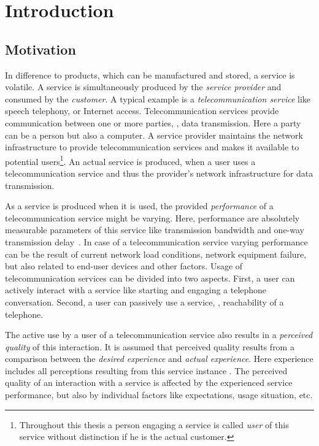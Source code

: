 \chapter{Introduction}\label{chap:01}

\section{Motivation}
In difference to products, which can be manufactured and stored, a service is volatile.
A service is simultaneously produced by the \emph{service provider} and consumed by the \emph{customer}.
A typical example is a \emph{telecommunication service} like speech telephony, or Internet access.
Telecommunication services provide communication between one or more parties, \ie, data transmission.
Here a party can be a person but also a computer.
A service provider maintains the network infrastructure to provide telecommunication services and makes it available to potential users\footnote{Throughout this thesis a person engaging a service is called \emph{user} of this service without distinction if he is the actual customer.}.
An actual service is produced, when a user uses a telecommunication service and thus the provider's network infrastructure for data transmission.

As a service is produced when it is used, the provided \emph{performance} of a telecommunication service might be varying.
Here, performance are absolutely measurable parameters of this service like transmission bandwidth and one-way transmission delay~\citep[\cf,][p. 12]{moller_assessment_2000}.
In case of a telecommunication service varying performance can be the result of current network load conditions, network equipment failure, but also related to end-user devices and other factors.
Usage of telecommunication services can be divided into two aspects.
First, a user can actively interact with a service like starting and engaging a telephone conversation.
Second, a user can passively use a service, \eg, reachability of a telephone.

The active use by a user of a telecommunication service also results in a \emph{perceived quality} of this interaction.
It is assumed that perceived quality results from a comparison between the \emph{desired experience} and \emph{actual experience}. %
Here experience includes all perceptions resulting from this service instance \citep[\cf,][p.13]{raake_quality_2014}.
The perceived quality of an interaction with a service is affected by the experienced service performance, but also by individual factors like expectations, usage situation, etc.

